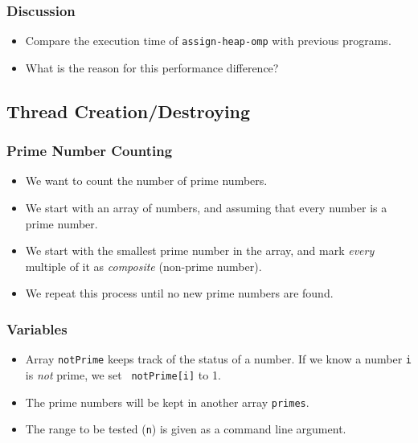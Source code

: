 \documentclass{beamer}
\begin{document}
\begin{frame}
  \frametitle{Discussion}
  \begin{itemize}
  \item Compare the execution time of {\tt assign-heap-omp} with
    previous programs.
  \item What is the reason for this performance difference?
  \end{itemize}
\end{frame}







\subsection{Thread Creation/Destroying}

\begin{frame}
  \frametitle{Prime Number Counting}
  \begin{itemize}
  \item We want to count the number of prime numbers.
  \item We start with an array of numbers, and assuming that every
    number is a prime number.
  \item We start with the smallest prime number in the array, and mark
    {\em every} multiple of it as {\em composite} (non-prime number).
  \item We repeat this process until no new prime numbers are found.
  \end{itemize}
\end{frame}


\begin{frame}
\frametitle{Variables}
\begin{itemize}
\item Array {\tt notPrime} keeps track of the status of a number.  If
  we know a number {\tt i} is {\em not} prime, we set {\tt
    notPrime[i]} to 1.
\item The prime numbers will be kept in another array {\tt primes}.
\item The range to be tested ({\tt n}) is given as a command line argument.
\end{itemize}
\end{frame}
\end{document}
